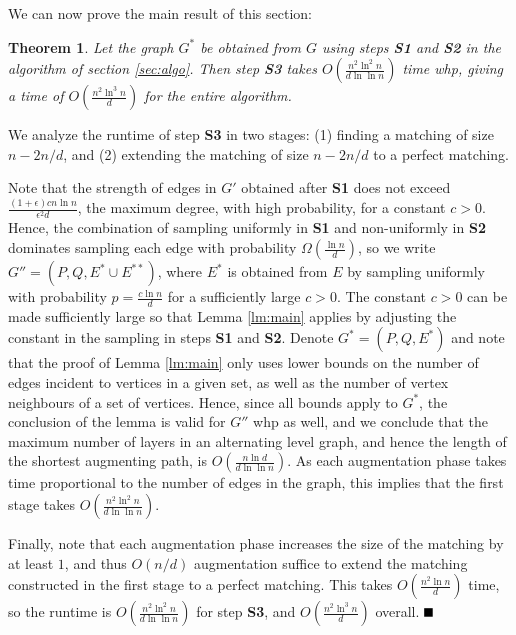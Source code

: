 \documentclass[11pt]{article}
\newcommand{\qed}{\mbox{}\hspace*{\fill}\nolinebreak\mbox{$\rule{0.6em}{0.6em}$}
}
\newcommand{\e}{{\epsilon}}
\newtheorem{theorem}{Theorem}[section]
\newenvironment{proof}{{\bf Proof:}}{$\qed$\par}
\begin{document}
We can now prove the main result of this section:
\begin{theorem}\label{thm:runtime}
  Let the graph $G^*$ be obtained from $G$ using steps \textbf{S1} and
  \textbf{S2} in the algorithm of section \ref{sec:algo}. Then step
  \textbf{S3} takes $O\left(\frac{n^2\ln^2 n}{d \ln \ln n}\right)$ time
  whp, giving a time of $O\left(\frac{n^2 \ln^3 n}{d}\right)$ for the entire
  algorithm.
\end{theorem}
\begin{proof}
We analyze the runtime of step \textbf{S3} in two stages: (1) finding a matching of size $n-2n/d$, and (2) extending the matching of size $n-2n/d$ to a perfect matching.

Note that the strength of edges in $G'$ obtained after \textbf{S1} does not exceed $\frac{(1+\e)cn\ln n}{\e^2 d}$, the maximum degree, with high probability, for a constant $c>0$. Hence, the combination of sampling uniformly in \textbf{S1} and non-uniformly in \textbf{S2} dominates sampling each edge with probability $\Omega\left(\frac{\ln n}{d}\right)$, so we write $G''=(P, Q, E^*\cup E^{**})$, where $E^*$ is obtained from $E$ by sampling uniformly with probability $p=\frac{c\ln n}{d}$ for a sufficiently large $c>0$. The constant $c>0$ can be made sufficiently large so that Lemma \ref{lm:main} applies by adjusting the constant in the sampling in steps \textbf{S1} and \textbf{S2}. Denote $G^*=(P, Q, E^*)$ and note that the proof of Lemma \ref{lm:main} only uses lower bounds on the number of edges incident to vertices in a given set, as well as the number of vertex neighbours of a set of vertices. Hence, since all bounds apply to $G^*$, the conclusion of the lemma is valid for $G''$ whp as well, and we conclude that the maximum number of layers in  an alternating level graph, and hence the length of the shortest augmenting path, is $O\left(\frac{n\ln d}{d \ln \ln n}\right)$. As each augmentation phase takes time proportional to the number of edges in the graph, this implies that the first stage takes $O\left(\frac{n^2\ln^2 n}{d \ln \ln n}\right)$.

Finally, note that each augmentation phase increases the size of the matching by at least $1$, and thus $O(n/d)$ augmentation suffice to extend the matching constructed in the first stage to a perfect matching. This takes $O\left(\frac{n^2\ln n}{d}\right)$ time, so the runtime is $O\left(\frac{n^2\ln^2 n}{d \ln \ln n}\right)$ for step \textbf{S3}, and $O\left(\frac{n^2\ln^3 n}{d}\right)$ overall.
\end{proof}
\end{document}
